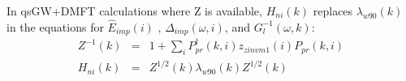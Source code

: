 \documentclass[aps,prb,singlecolumn,preprintnumbers,amsmath,amssymb]{revtex4}
\begin{document}
 In qsGW+DMFT calculations where Z is available, $H_{ni}(k) $ replaces $\lambda_{w90}(k)$ in the equations for $\hat{E}_{imp}(i) $ , $\hat{\Delta}_{imp}(\omega,i) $, and  $G_{l}^{-1}(\omega, k)$:
 \begin{eqnarray}
Z^{-1}(k) &=& 1 + \sum_i P_{pr}^\dagger(k,i) z_{zinvm1}(i) P_{pr}(k,i) \nonumber \\ 
H_{ni}(k) &=& Z^{1/2}(k)   \lambda_{w90}(k) Z^{1/2}(k)  
\end{eqnarray}


\end{document}
